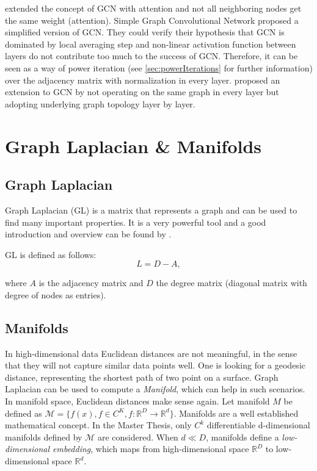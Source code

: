 \citet{GAT} extended the concept of GCN with attention and not all neighboring nodes get the same weight (attention).
Simple Graph Convolutional Network \cite{simpleGCN} proposed a simplified version of GCN.
They could verify their hypothesis that GCN is dominated by local averaging step and non-linear 
activation function between layers do not contribute too much to the success of GCN. 
Therefore, it can be seen as a way of power iteration (see \ref{sec:powerIterations} \textit{} for further information) over the adjacency matrix with normalization in every layer.
\citet{dynamicGCN} proposed an extension to GCN by not operating on the same graph in every layer but adopting
underlying graph topology layer by layer.

\section{Graph Laplacian \& Manifolds}
\subsection{Graph Laplacian}
Graph Laplacian (GL) is a matrix that represents a graph and can be used to find many important properties.
It is a very powerful tool and a good introduction and overview can be found by \cite{tutorialSpectralClustering, SpectralGraphTheory}. 

GL is defined as follows:
\begin{equation}
    \label{eq:gl}
    L = D - A,
\end{equation}

where $A$ is the adjacency matrix and $D$ the degree matrix (diagonal matrix with degree of nodes as entries).

\subsection{Manifolds}
\label{sec:manifolds}

In high-dimensional data Euclidean distances are not meaningful,
in the sense that they will not capture similar data points well. One is looking for a geodesic distance, 
representing the shortest path of two point on a surface.
Graph Laplacian can be used to compute a \textit{Manifold}, which can help in such scenarios. 
In manifold space, Euclidean distances make sense again. 
Let manifold $M$ be defined as $\mathcal{M} = \{ f(x), f \in C^K, f: \mathbb{R}^D \to \mathbb{R}^d \}$.
Manifolds are a well established mathematical concept. In the Master Thesis, only 
$C^k$ differentiable d-dimensional manifolds defined by $\mathcal{M}$ are considered. 
When $d \ll D$, manifolds define a \textit{low-dimensional embedding}, which maps from high-dimensional space 
$\mathbb{R}^D$ to low-dimensional space $\mathbb{R}^d$.

